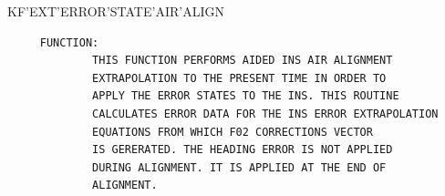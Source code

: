 \begin{frame}
KF'EXT'ERROR'STATE'AIR'ALIGN
\begin{verbatim}
     FUNCTION:
             THIS FUNCTION PERFORMS AIDED INS AIR ALIGNMENT
             EXTRAPOLATION TO THE PRESENT TIME IN ORDER TO
             APPLY THE ERROR STATES TO THE INS. THIS ROUTINE
             CALCULATES ERROR DATA FOR THE INS ERROR EXTRAPOLATION
             EQUATIONS FROM WHICH F02 CORRECTIONS VECTOR
             IS GERERATED. THE HEADING ERROR IS NOT APPLIED
             DURING ALIGNMENT. IT IS APPLIED AT THE END OF
             ALIGNMENT.

\end{verbatim}
\end{frame}
